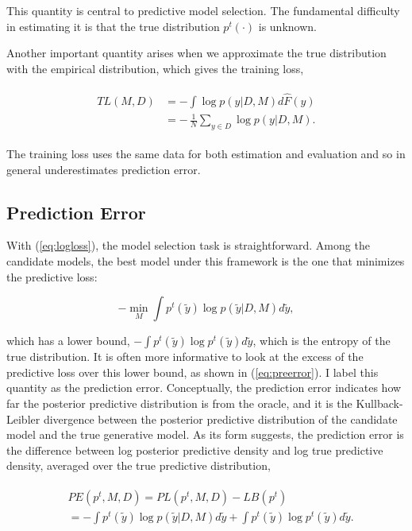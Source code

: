 \noindent This quantity is central to predictive model selection. The
fundamental difficulty in estimating it is that the true distribution
\(p^t(\cdot)\) is unknown.

Another important quantity arises when we approximate the true
distribution with the empirical distribution, which gives the training
loss,

\begin{align}
  \begin{split}
  \label{eq:trloss}
  TL(M, D)&=-\int \log p(y|D, M) d\hat{F}(y)\\
  &=-\,\frac{1}{N}\sum_{y\in D}\log p(y | D, M).
  \end{split}
\end{align}

The training loss uses the same data for both estimation and evaluation
and so in general underestimates prediction error.

\subsection{Prediction Error}\label{prediction-error}

With (\ref{eq:logloss}), the model selection task is straightforward.
Among the candidate models, the best model under this framework is the
one that minimizes the predictive loss:

\begin{equation}
  \label{eq:minimizer}
  - \min_{M} \int \!p^t(\tilde y) \log p(\tilde y|D, M) d\tilde y,
  \end{equation}

which has a lower bound,
\(-\!\int\! p^t(\tilde y) \log p^t(\tilde y) d\tilde y\), which is the
entropy of the true distribution. It is often more informative to look
at the excess of the predictive loss over this lower bound, as shown in
(\ref{eq:preerror}). I label this quantity as the prediction error.
Conceptually, the prediction error indicates how far the posterior
predictive distribution is from the oracle, and it is the
Kullback-Leibler divergence between the posterior predictive
distribution of the candidate model and the true generative model. As
its form suggests, the prediction error is the difference between log
posterior predictive density and log true predictive density, averaged
over the true predictive distribution,

\begin{align}
\begin{split}
  \label{eq:preerror}
    &PE(p^t, M, D)= PL(p^t, M, D) - LB(p^t) \\  
               &=-\int p^t(\tilde y) \log p(\tilde y|D, M) d\tilde y+\int
               p^t(\tilde y) \log p^t(\tilde y) d\tilde y.
               \end{split}
\end{align}

